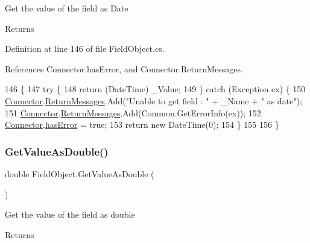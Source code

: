 Get the value of the field as Date 

\begin{DoxyReturn}{Returns}

\end{DoxyReturn}


Definition at line 146 of file Field\+Object.\+cs.



References Connector.\+has\+Error, and Connector.\+Return\+Messages.


\begin{DoxyCode}
146                                      \{
147         \textcolor{keywordflow}{try} \{
148             \textcolor{keywordflow}{return} (DateTime) \_Value;
149         \} \textcolor{keywordflow}{catch} (Exception ex) \{
150             \hyperlink{class_connector}{Connector}.\hyperlink{class_connector_a1ed422674b344524fd77998dcf6a9ba6}{ReturnMessages}.Add(\textcolor{stringliteral}{"Unable to get field : "} + \_Name + \textcolor{stringliteral}{" as
       date"});
151             \hyperlink{class_connector}{Connector}.\hyperlink{class_connector_a1ed422674b344524fd77998dcf6a9ba6}{ReturnMessages}.Add(Common.GetErrorInfo(ex));
152             \hyperlink{class_connector}{Connector}.\hyperlink{class_connector_a079bae21a5417efa53bfe8954c0f533f}{hasError} = \textcolor{keyword}{true};
153             \textcolor{keywordflow}{return} \textcolor{keyword}{new} DateTime(0);
154         \}
155        
156     \}
\end{DoxyCode}
\mbox{\label{class_field_object_aafe2b7d3e7d414345d85e19dddce3c47}} 
\subsubsection{\texorpdfstring{Get\+Value\+As\+Double()}{GetValueAsDouble()}}
{\footnotesize\ttfamily double Field\+Object.\+Get\+Value\+As\+Double (\begin{DoxyParamCaption}{ }\end{DoxyParamCaption})}



Get the value of the field as double 

\begin{DoxyReturn}{Returns}

\end{DoxyReturn}


